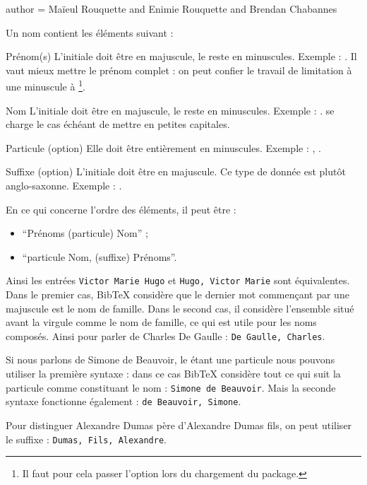 \begin{latexcode}
author = {Maïeul Rouquette and Enimie Rouquette and Brendan Chabannes}
\end{latexcode}

Un nom contient les éléments suivant :
\begin{choix}
	\item[Prénom(s)]L'initiale doit être en majuscule, le reste en minuscules. Exemple : . Il vaut mieux mettre le prénom complet : on peut confier le travail de limitation à une minuscule  à \footnote{Il faut pour cela passer l'option  lors du chargement du package.}.
	\item[Nom]L'initiale doit être en majuscule, le reste en minuscules. Exemple : .  se charge le cas échéant de mettre en petites capitales.
	\item[Particule (option)]Elle doit être entièrement en minuscules. Exemple : , .
	\item[Suffixe (option)]L'initiale doit être en majuscule. Ce type de donnée est plutôt anglo-saxonne. Exemple : .
\end{choix}


En ce qui concerne l'ordre des éléments, il  peut être :
\begin{itemize}
\item\enquote{Prénoms  (particule)  Nom} ;
\item\enquote{particule Nom, (suffixe) Prénoms}.
\end{itemize}

Ainsi les entrées \verb|Victor Marie Hugo| et \verb|Hugo, Victor Marie| sont équivalentes.
Dans le premier cas, BibTeX considère que le dernier mot commençant par une majuscule est le nom de famille. Dans le second cas, il considère l'ensemble situé avant la virgule comme le nom de famille, ce qui est utile pour les noms composés. Ainsi pour parler de Charles De Gaulle : \verb|De Gaulle, Charles|.

Si nous parlons de Simone de Beauvoir, le  étant une particule nous pouvons utiliser la première syntaxe : dans ce cas BibTeX considère tout ce qui suit la particule comme constituant le nom : \verb|Simone de Beauvoir|.
Mais la seconde syntaxe fonctionne également : \verb|de Beauvoir, Simone|.


Pour distinguer Alexandre Dumas père d'Alexandre Dumas fils, on peut utiliser le suffixe : \verb|Dumas, Fils, Alexandre|.


